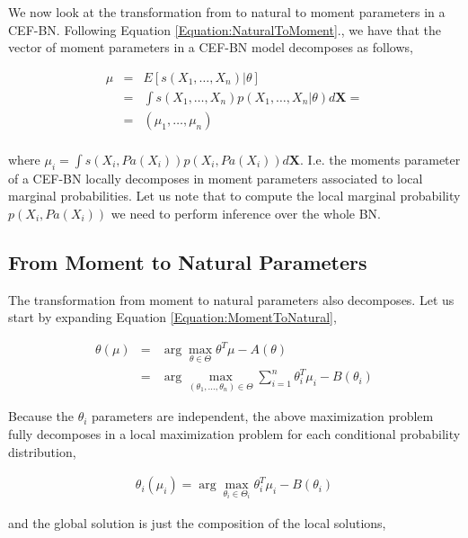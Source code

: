 \documentclass[11pt, oneside]{article}   	%
\newcommand{\bm}{\mathbf}
\numberwithin{figure}{section}
\numberwithin{equation}{section}
\numberwithin{table}{section}
\newcommand{\e}[1]{E\left[ #1 \right]}
\theoremstyle{definition}
\begin{document}
We now look at the transformation from to natural to moment parameters in a CEF-BN. Following Equation \ref{Equation:NaturalToMoment}., we have that the vector of moment parameters in a CEF-BN model decomposes as follows,

\begin{equation}
\begin{array}{lll}
\mu & = & \e{s(X_1,\ldots, X_n)|\theta} \\
&=& \int s(X_1,\ldots, X_n)p(X_1,\ldots, X_n|\theta) 
d\bm X = \\
&=& (\mu_1,\ldots,\mu_n) \\
\end{array}
\end{equation}

\noindent where $\mu_i= \int s(X_i,Pa(X_i)) p(X_i,Pa(X_i)) d\bm X$. I.e. the moments parameter of a CEF-BN locally decomposes in moment parameters associated to local marginal probabilities. Let us note that to compute the local marginal probability  $p(X_i,Pa(X_i))$ we need to perform inference over the whole BN.

\subsection{From Moment to Natural Parameters}
\label{Section:CEFBN:MomentToNatural}


The transformation from moment to natural parameters also decomposes. Let us start by expanding Equation \ref{Equation:MomentToNatural}, 

\begin{eqnarray}
\label{Equation:CEFBN_MomentToNatural}
\theta(\mu) &=& \arg\max_{\theta\in\Theta} \theta^T\mu
-A(\theta)\nonumber \\
&=& \arg\max_{(\theta_1,\ldots, \theta_n) \in\Theta} \sum_{i=1}^n \theta_i^T \mu_i - B(\theta_i) 
\end{eqnarray}

Because the $\theta_i$ parameters are independent, the above maximization problem fully decomposes in a local maximization problem for each conditional probability distribution,  

\begin{eqnarray}
\label{Equation:CEFBN_MomentToNaturalLocal}
\theta_i(\mu_i) = \arg\max_{\theta_i\in\Theta_i} \theta_i^T\mu_i - B(\theta_i)
\end{eqnarray}

\noindent and the global solution is just the composition of the local solutions, 
\end{document}
